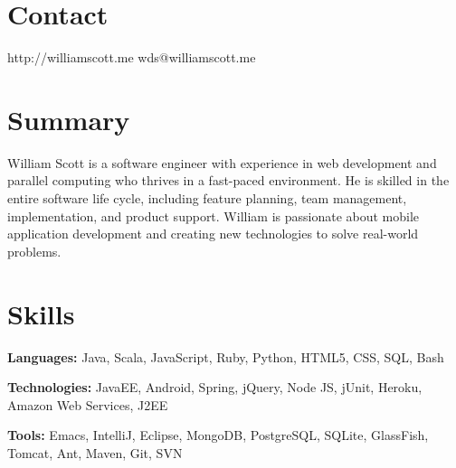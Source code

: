 \documentclass[margin,line]{resume}
\begin{document}
\begin{resume}
	\vspace{-4mm}


  \section{\mysidestyle \textcolor{mySideColor}{Contact}}

	http://williamscott.me \hfill wds@williamscott.me




  \section{\mysidestyle \textcolor{mySideColor}{Summary}}

  William Scott is a software engineer with experience in web
  development and parallel computing who thrives in a fast-paced
  environment. He is skilled in the entire software life cycle,
  including feature planning, team management, implementation, and
  product support. William is passionate about mobile application
  development and creating new technologies to solve real-world
  problems.


  \section{\mysidestyle \textcolor{mySideColor}{Skills}}

  \textbf{Languages:} Java, Scala, JavaScript, Ruby, Python, HTML5,
  CSS, SQL, Bash
	\vspace{-2mm}

  \textbf{Technologies:} JavaEE, Android, Spring, jQuery, Node JS,
  jUnit, Heroku, Amazon Web Services, J2EE
	\vspace{-2mm}

  \textbf{Tools:} Emacs, IntelliJ, Eclipse, MongoDB, PostgreSQL, SQLite,
  GlassFish, Tomcat, Ant, Maven, Git, SVN
	\vspace{-2mm}


\end{resume}
\end{document}
